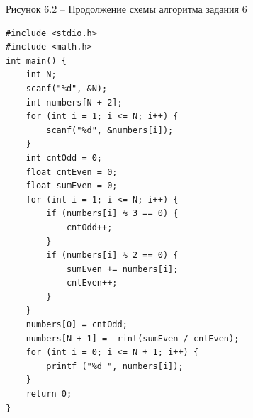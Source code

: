 \documentclass[a4paper,14pt]{extarticle}
\begin{document}
	\begin{center}
		Рисунок 6.2 – Продолжение схемы алгоритма задания 6
	\end{center}
	\begin{lstlisting}[tabsize=2,basicstyle=\ttfamily]
#include <stdio.h>
#include <math.h>
int main() {
	int N;
	scanf("%d", &N);
	int numbers[N + 2];
	for (int i = 1; i <= N; i++) {
		scanf("%d", &numbers[i]);
	}
	int cntOdd = 0;
	float cntEven = 0;
	float sumEven = 0;
	for (int i = 1; i <= N; i++) {
		if (numbers[i] % 3 == 0) {
			cntOdd++;
		}
		if (numbers[i] % 2 == 0) {
			sumEven += numbers[i];
			cntEven++;
		}
	}
	numbers[0] = cntOdd;
	numbers[N + 1] =  rint(sumEven / cntEven);
	for (int i = 0; i <= N + 1; i++) {
		printf ("%d ", numbers[i]);
	}
	return 0;
}
	\end{lstlisting}
	
	\newpage
\end{document}
